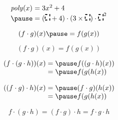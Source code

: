 \documentclass[aspectratio=169]{beamer}
\def\placeholder{\tikz\node[draw=black,dashed,very thick] {\vphantom{.}};}
\begin{document}
\fontsize{22}{22}\selectfont

\begin{frame}[t]
\begin{equation*}
\begin{array}{l@{\;=\;}l}
\mathit{poly}(x) & 3x^2 + 4 \\ \pause
 & (\placeholder + 4) \cdot (3 \times \placeholder) \cdot \placeholder^2
\end{array}
\end{equation*}

\pause

\begin{equation*}
(f \cdot g)(x) \pause = f(g(x))
\end{equation*}

\end{frame}

\begin{frame}

\begin{equation*}
(f \cdot g)(x) = f(g(x))
\end{equation*}

\pause

\begin{equation*}
\begin{array}{l@{\;=\;}l}
(f \cdot (g \cdot h)) (x) & \pause f((g \cdot h)(x)) \\
& \pause f(g(h(x)) \\
\end{array}
\end{equation*}

\pause

\begin{equation*}
\begin{array}{l@{\;=\;}l}
((f \cdot g) \cdot h)(x) & \pause (f \cdot g)(h(x)) \\
& \pause f(g(h(x)) \\
\end{array}
\end{equation*}

\pause

\begin{equation*}
f \cdot (g \cdot h) = (f \cdot g) \cdot h = f \cdot g \cdot h
\end{equation*}

\end{frame}
\end{document}
